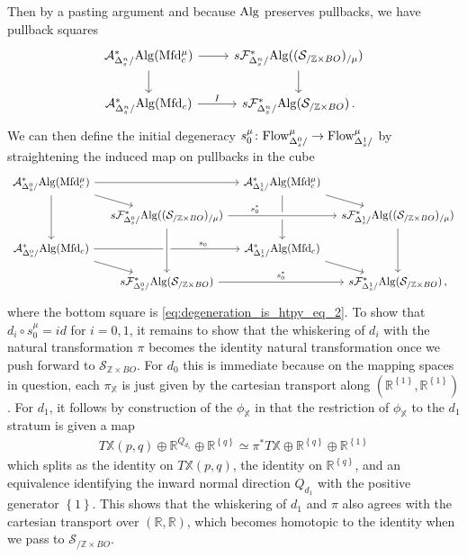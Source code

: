 \documentclass[10pt]{amsart}
\numberwithin{equation}{section}
\theoremstyle{definition}
\newcommand{\PreFlow}{\mathrm{Flow}\vphantom{w}}
\newcommand{\Mfd}{\mathrm{Mfd}\vphantom{d}}
\newcommand{\Alg}{\mathrm{Alg}\vphantom{z}}
\newcommand{\bZ}{\mathbb{Z}}
\newcommand{\bR}{\mathbb{R}}
\newcommand{\bX}{\mathbb{X}}
\newcommand{\cA}{\mathcal{A}}
\newcommand{\cS}{\mathcal{S}}
\newcommand{\cF}{\mathcal{F}}
\renewcommand{\to}{\mathchoice{\longrightarrow}{\rightarrow}{}{}}
\begin{document}
Then by a pasting argument and because $\Alg$ preserves pullbacks, we have pullback squares
\begin{equation*}
	\begin{tikzcd}
		\cA_{\Delta^{n}_{s}/}^{*}\Alg(\Mfd_{c}^{\mu}) \arrow[r] \arrow[d]      &   s\cF_{\Delta^{n}_{s}/}^{*}\Alg( (\cS_{/\bZ\times BO})_{/\mu}  )  \arrow[d] \\
		\cA_{\Delta^{n}_{s}/}^{*}\Alg(\Mfd_{c})  \arrow[r,"I"]               &  s\cF_{\Delta^{n}_{s}/}^{*}\Alg(\cS_{/ \bZ\times BO}) \,.
	\end{tikzcd}
\end{equation*}
We can then define the initial degeneracy $s_{0}^{\mu}\colon \PreFlow^{\mu}_{\Delta^{0}_{s}/} \to \PreFlow^{\mu}_{\Delta^{1}_{s}/}$ by straightening the induced map on pullbacks in the cube
\begin{equation*}
	\begin{tikzcd}[row sep=1em, column sep=1em]
		\cA_{\Delta^{0}_{s}/}^{*}\Alg(\Mfd_{c}^{\mu}) \arrow[rr] \arrow[dd] \arrow[dr] & & \cA_{\Delta^{1}_{s}/}^{*}\Alg(\Mfd_{c}^{\mu}) \arrow[dd] \arrow[dr] \\
		&  s\cF_{\Delta^{0}_{s}/}^{*}\Alg( (\cS_{/\bZ\times BO})_{/\mu}  ) \arrow[rr, "s_{0}^{*}"{near start}, crossing over]  & &  s\cF_{\Delta^{1}_{s}/}^{*}\Alg( (\cS_{/\bZ\times BO})_{/\mu}  ) \arrow[dd] \\
		\cA_{\Delta^{0}_{s}/}^{*}\Alg(\Mfd_{c}) \arrow[rr, "s_{0}"{near end}] \arrow[dr] & & \cA_{\Delta^{1}_{s}/}^{*}\Alg(\Mfd_{c}) \arrow[dr] \\
		& s\cF_{\Delta^{0}_{s}/}^{*}\Alg(\cS_{/ \bZ\times BO}) \arrow[rr, "s_{0}^{*}"] & & s\cF_{\Delta^{1}_{s}/}^{*}\Alg(\cS_{/ \bZ\times BO}) \, ,
		\arrow[from=2-2, to= 4-2, crossing over]
	\end{tikzcd}
\end{equation*}
where the bottom square is \eqref{eq:degeneration_is_htpy_eq_2}.
To show that $d_{i}\circ s_{0}^{\mu}= id$ for $i=0,1$, it remains to show that the whiskering of $d_{i}$ with the natural transformation $\pi$ becomes the identity natural transformation once we push forward to $\cS_{\bZ\times BO}$.
For $d_{0}$ this is immediate because on the mapping spaces in question, each $\pi_{\bX}$ is just given by the cartesian transport along $(\bR^{ \left\{ 1\right\}}, \bR^{ \left\{ 1\right\}})$. For $d_{1}$, it follows by construction of the $\phi_{\bX}$ in \cite{AB} that the restriction of $\phi_{\bX}$ to the $d_{1}$ stratum is given a map
\begin{align*}
	T\bX(p,q) \oplus \bR^{Q_{d_{1}}} \oplus \bR^{ \left\{ q\right\}} \simeq \pi^{*}T\bX \oplus \bR^{ \left\{ q\right\}} \oplus \bR^{ \left\{ 1\right\}}
\end{align*}
which splits as the identity on $T\bX(p,q)$, the identity on $\bR^{ \left\{ q\right\}}$, and an equivalence identifying the inward normal direction $Q_{d_{1}}$ with the positive generator $\left\{ 1\right\}$.
This shows that the whiskering of $d_{1}$ and $\pi$ also agrees with the cartesian transport over $(\bR, \bR)$, which becomes homotopic to the identity when we pass to $\cS_{/\bZ\times BO}$.
\end{document}
